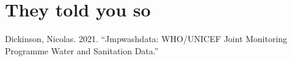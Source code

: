 \documentclass[
  letterpaper,
  DIV=11,
  numbers=noendperiod]{scrartcl}
\newlength{\cslhangindent}
\newlength{\cslentryspacingunit} %
\newenvironment{CSLReferences}[2] %
 {%
  \setlength{\parindent}{0pt}
  \ifodd #1
  \let\oldpar\par
  \def\par{\hangindent=\cslhangindent\oldpar}
  \fi
  \setlength{\parskip}{#2\cslentryspacingunit}
 }%
 {}
\begin{document}
\hypertarget{they-told-you-so}{%
\section*{They told you so}\label{they-told-you-so}}

\hypertarget{refs}{}
\begin{CSLReferences}{1}{0}
\leavevmode{}%
Dickinson, Nicolas. 2021. {``Jmpwashdata: WHO/UNICEF Joint Monitoring
Programme Water and Sanitation Data.''}

\end{CSLReferences}
\end{document}
